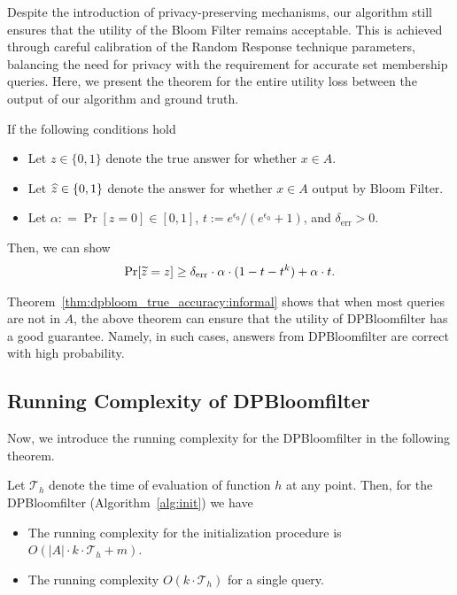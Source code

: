 Despite the introduction of privacy-preserving mechanisms, our algorithm still ensures that the utility of the Bloom Filter remains acceptable. This is achieved through careful calibration of the Random Response technique parameters, balancing the need for privacy with the requirement for accurate set membership queries. 
Here, we present the theorem for the entire utility loss between the output of our algorithm and ground truth.

\begin{theorem}\label{thm:dpbloom_true_accuracy:informal}
If the following conditions hold
\begin{itemize}
    \item Let $z \in \{0,1\}$ denote the true answer for whether $x \in A$. 
    \item Let $\widehat{z} \in \{0,1\}$ denote the answer for whether $x \in A$ output by Bloom Filter.
    \item Let $\alpha: = \Pr[ z = 0 ] \in [0,1]$, $t := e^{\epsilon_0} / (e^{\epsilon_0} + 1)$, and  $\delta_{\mathrm{err}} > 0$.
\end{itemize}
Then, we can show 
\begin{align*}
\Pr[ \widetilde{z} = z ] \geq \delta_{\mathrm{err}}\cdot\alpha\cdot(1-t-t^{k}) + \alpha \cdot t.
\end{align*}
\end{theorem}

Theorem~\ref{thm:dpbloom_true_accuracy:informal} shows that when most queries are not in $A$, the above theorem can ensure that the utility of DPBloomfilter has a good guarantee. Namely, in such cases, answers from DPBloomfilter are correct with high probability. 


\subsection{Running Complexity of DPBloomfilter}\label{sec:main_result:running_complexity}

Now, we introduce the running complexity for the DPBloomfilter in the following theorem. 

\begin{theorem}  \label{thm:running_complexity}
Let $\mathcal{T}_h$ denote the time of evaluation of function $h$ at any point. 
Then, for the DPBloomfilter (Algorithm~\ref{alg:init}) we have
\begin{itemize}
    \item The running complexity for the initialization procedure is $O(|A| \cdot k \cdot \mathcal{T}_h + m)$.
    \item The running complexity $O(k\cdot \mathcal{T}_h)$ for a single query. 
\end{itemize}
\end{theorem}

